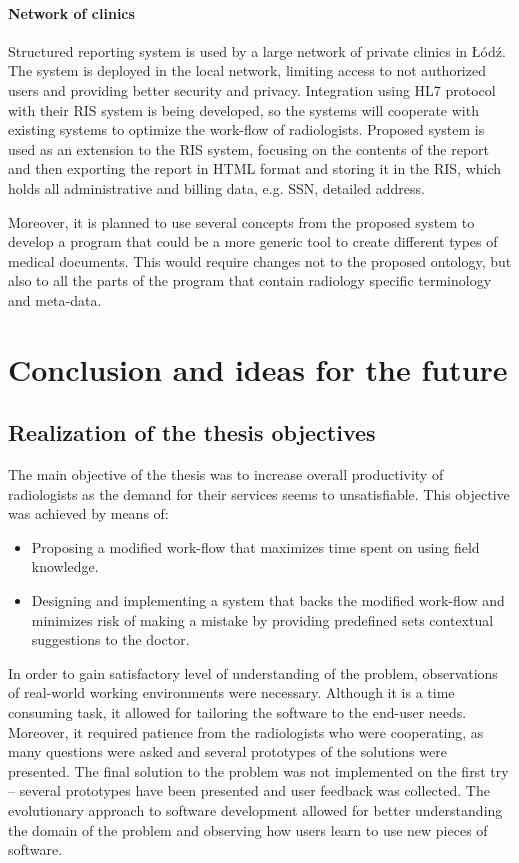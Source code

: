 \documentclass[12pt, twoside, openany]{report}
\theoremstyle{definition}
\begin{document}
\subsubsection{Network of clinics}
Structured reporting system is used by a large network of private clinics in Łódź. The system is deployed in the local network, limiting access to not authorized users and providing better security and privacy. Integration using HL7 protocol with their RIS system is being developed, so the systems will cooperate with existing systems to optimize the work-flow of radiologists. Proposed system is used as an extension to the RIS system, focusing on the contents of the report and then exporting the report in HTML format and storing it in the RIS, which holds all administrative and billing data, e.g. SSN, detailed address.

Moreover, it is planned to use several concepts from the proposed system to develop a program that could be a more generic tool to create different types of medical documents. This would require changes not to the proposed ontology, but also to all the parts of the program that contain radiology specific terminology and meta-data.


\chapter{Conclusion and ideas for the future}
\section{Realization of the thesis objectives}
The main objective of the thesis was to increase overall productivity of radiologists as the demand for their services seems to unsatisfiable. This objective was achieved by means of:
\begin{itemize}
	\item Proposing a modified work-flow that maximizes time spent on using field knowledge.
	\item Designing and implementing a system that backs the modified work-flow and minimizes risk of making a mistake by providing predefined sets contextual suggestions to the doctor.
\end{itemize}
In order to gain satisfactory level of understanding of the problem, observations of real-world working environments were necessary. Although it is a time consuming task, it allowed for tailoring the software to the end-user needs. Moreover, it required patience from the radiologists who were cooperating, as many questions were asked and several prototypes of the solutions were presented. The final solution to the problem was not implemented on the first try -- several prototypes have been presented and user feedback was collected. The evolutionary approach to software development allowed for better understanding the domain of the problem and observing how users learn to use new pieces of software.
\end{document}

